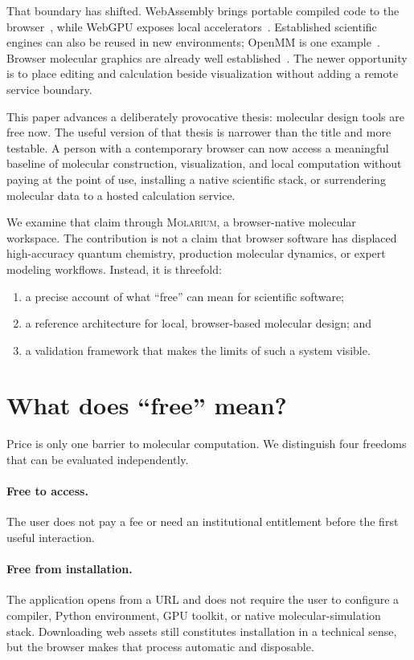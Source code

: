 \documentclass[11pt]{article}
\newcommand{\molarium}{\textsc{Molarium}}
\begin{document}
That boundary has shifted.
WebAssembly brings portable compiled code to the browser~\cite{haas2017webassembly},
while WebGPU exposes local accelerators~\cite{w3c2025webgpu}.
Established scientific engines can also be reused in new environments; OpenMM is
one example~\cite{eastman2017openmm}.
Browser molecular graphics are already well established~\cite{rose2015ngl}.
The newer opportunity is to place editing and calculation beside visualization
without adding a remote service boundary.

This paper advances a deliberately provocative thesis: molecular design tools
are free now.
The useful version of that thesis is narrower than the title and more testable.
A person with a contemporary browser can now access a meaningful baseline of
molecular construction, visualization, and local computation without paying at
the point of use, installing a native scientific stack, or surrendering molecular
data to a hosted calculation service.

We examine that claim through \molarium, a browser-native molecular workspace.
The contribution is not a claim that browser software has displaced
high-accuracy quantum chemistry, production molecular dynamics, or expert
modeling workflows.
Instead, it is threefold:

\begin{enumerate}
  \item a precise account of what ``free'' can mean for scientific software;
  \item a reference architecture for local, browser-based molecular design; and
  \item a validation framework that makes the limits of such a system visible.
\end{enumerate}

\section{What does \enquote{free} mean?}
\label{sec:free}

Price is only one barrier to molecular computation.
We distinguish four freedoms that can be evaluated independently.

\paragraph{Free to access.}
The user does not pay a fee or need an institutional entitlement before the
first useful interaction.

\paragraph{Free from installation.}
The application opens from a URL and does not require the user to configure a
compiler, Python environment, GPU toolkit, or native molecular-simulation stack.
Downloading web assets still constitutes installation in a technical sense, but
the browser makes that process automatic and disposable.
\end{document}
